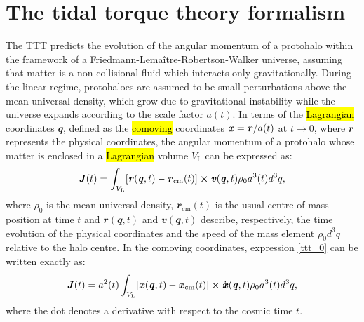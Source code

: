 \documentclass[fleqn,usenatbib]{mnras}
\begin{document}
\section{The tidal torque theory formalism}
\label{ttt_formalism}

The TTT predicts the evolution of the angular momentum of a protohalo within the framework of a Friedmann-Lema\^{i}tre-Robertson-Walker universe, assuming that matter is a non-collisional fluid which interacts only gravitationally. During the linear regime, protohaloes are assumed to be small perturbations above the mean universal density, which grow due to gravitational instability while the universe expands according to the scale factor $a(t)$. In terms of the \hl{Lagrangian} coordinates $\mathbfit{q}$, defined as the \hl{comoving} coordinates $\textbf{\emph{x}}=\textbf{\textit{r}}/a(t)$ at $t\rightarrow 0$, where $\mathbfit{r}$ represents the physical coordinates, the angular momentum of a protohalo whose matter is enclosed in a \hl{Lagrangian} volume $V_\mathrm{L}$ can be expressed as:
\begin{equation}
\label{ttt_0}
\mathbfit{J}(t) = \int_{V_\mathrm{L}}[\mathbfit{r}(\mathbfit{q},t)-\mathbfit{r}_\mathrm{cm}(t)] \bmath{\times} \mathbfit{v}(\mathbfit{q},t)\rho_0a^3(t)d^3q,
\end{equation}
where $\rho_0$ is the mean universal density, $\mathbfit{r}_\mathrm{cm}(t)$ is the usual centre-of-mass position at time $t$ and $\mathbfit{r}(\mathbfit{q},t)$ and $\mathbfit{v}(\mathbfit{q},t)$ describe, respectively, the time evolution of the physical coordinates and the speed of the mass element $\rho_0d^3q$ relative to the halo centre. In the comoving coordinates, expression \eqref{ttt_0} can be written exactly as:
\begin{equation}
\label{ttt_1}
\mathbfit{J}(t) = a^2(t)\int_{V_\mathrm{L}}[\textbf{\emph{x}}(\mathbfit{q},t)-\textbf{\emph{x}}_\mathrm{cm}(t)] \bmath{\times} \dot{\mathbfit{x}}(\mathbfit{q},t)\rho_0a^3(t)d^3q,
\end{equation}
where the dot denotes a derivative with respect to the cosmic time $t$. 
\end{document}
